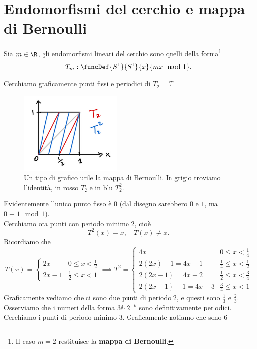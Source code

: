 \section{Endomorfismi del cerchio e mappa di Bernoulli}
\begin{definition}
Sia $m\in\R$, gli endomorfismi lineari del cerchio sono quelli della forma\footnote{Il caso $m=2$ restituisce la \textbf{mappa di Bernoulli}.}
\[T_m:\funcDef{S^1}{S^1}{x}{mx\mod 1}.\]
\end{definition}

\begin{example}
Cerchiamo graficamente punti fissi e periodici di $T_2=T$
\begin{figure}[!htb]
    \centering
    \includegraphics[width=5cm]{Immagini/Bernoulli.png}
    \caption{Un tipo di grafico utile la mappa di Bernoulli. In grigio troviamo l'identit\`a, in rosso $T_2$ e in blu $T_2^2$.}
\end{figure}

\noindent Evidentemente l'unico punto fisso \`e $0$ (dal disegno sarebbero $0$ e $1$, ma $0\equiv 1\mod 1$).\\
Cerchiamo ora punti con periodo minimo $2$, cio\`e
\[T^2(x)=x,\quad T(x)\neq x.\]
Ricordiamo che
\[T(x)=\begin{cases}
2x & 0\leq x< \frac12\\
2x-1 & \frac12\leq x<1
\end{cases}\implies
T^2=\begin{cases}
4x & 0\leq x<\frac14\\
2(2x)-1=4x-1 & \frac14\leq x<\frac12\\
2(2x-1)=4x-2 & \frac12\leq x<\frac34\\
2(2x-1)-1=4x-3 & \frac34\leq x<1
\end{cases}\]
Graficamente vediamo che ci sono due punti di periodo $2$, e questi sono $\frac13$ e $\frac23$. Osserviamo che i numeri della forma $3\ii\cdot 2^{-k}$ sono definitivamente periodici.\\
Cerchiamo i punti di periodo minimo $3$. Graficamente notiamo che sono $6$
    

\end{example}
